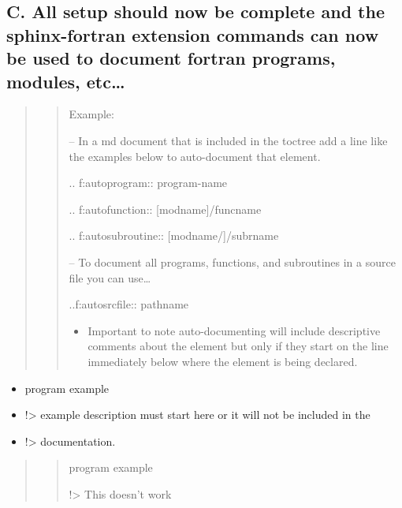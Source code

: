 \documentclass[letterpaper,10pt,english]{sphinxmanual}
\begin{document}
\subsection{C. All setup should now be complete and the sphinx-fortran extension commands can now be used to document fortran programs, modules, etc…}
\label{docs/Process:c-all-setup-should-now-be-complete-and-the-sphinx-fortran-extension-commands-can-now-be-used-to-document-fortran-programs-modules-etc}\begin{quote}
\begin{quote}

Example:

-- In a md document that is included in the toctree add a line like the examples below to auto-document that element.

.. f:autoprogram:: program-name

.. f:autofunction:: {[}modname{]}/funcname

.. f:autosubroutine:: {[}modname/{]}/subrname

-- To document all programs, functions, and subroutines in a source file you can use…

..f:autosrcfile:: pathname
\begin{itemize}
\item {} 
Important to note auto-documenting will include descriptive comments about the element but only if they start on the line immediately below where the element is being declared.

\end{itemize}
\end{quote}
\end{quote}
\begin{itemize}
\item {} 
program example

\item {} 
!\textgreater{} example description must start here or it will not be included in the

\item {} 
!\textgreater{} documentation.

\end{itemize}
\begin{quote}
\begin{quote}

program example

!\textgreater{} This doesn’t work
\end{quote}
\end{quote}
\end{document}
